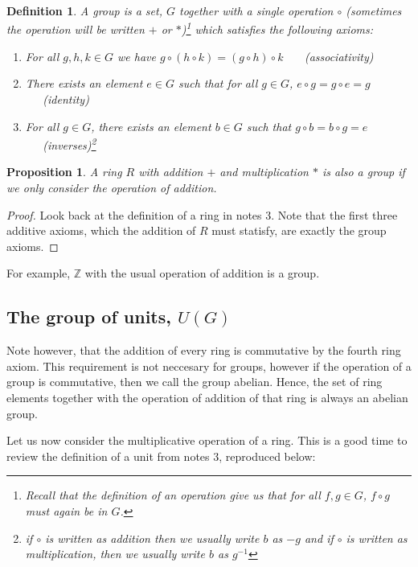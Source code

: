\documentclass{article}
\theoremstyle{problemstyle}
\newtheorem{proposition}{Proposition}
\newtheorem{definition}{Definition}
\begin{document}
\begin{definition}
A group is a set, $G$ together with a single operation $\circ$  (sometimes the operation will be written $+$ or $*$)\footnote{Recall that the definition of an operation give us that for all $f,g \in G$, $f \circ g$ must again be in $G$.} which satisfies the following axioms:

\begin{enumerate}
\item For all $g,h,k \in G$ we have $g \circ (h\circ k) = (g \circ h)\circ k$ \ \ \ (associativity)
\item There exists an element $e \in G$ such that for all $g \in G$, $e \circ g = g \circ e = g$ \ \ \ (identity)
\item For all $g \in G$, there exists an element $b \in G$ such that $g\circ b = b \circ g = e$ \ \ \ (inverses)\footnote{ if $\circ$ is written as addition then we usually write $b$ as $-g$ and if $\circ$ is written as multiplication, then we usually write $b$ as $g^{-1}$}
\end{enumerate}
\end{definition}

\begin{proposition}
A ring $R$ with addition $+$ and multiplication $*$ is also a group if we only consider the operation of addition. 
\end{proposition}

\begin{proof}
Look back at the definition of a ring in notes 3. Note that the first three additive axioms, which the addition of $R$ must statisfy, are exactly the group axioms. 
\end{proof}

For example, $\mathbb{Z}$ with the usual operation of addition is a group. 

\subsection*{The group of units, $U(G)$}

Note however, that the addition of every ring is commutative by the fourth ring axiom. This requirement is not neccesary for groups, however if the operation of a group is commutative, then we call the group abelian. Hence, the set of ring elements together with the operation of addition of that ring is always an abelian group. 

Let us now consider the multiplicative operation of a ring. This is a good time to review the definition of a unit from notes 3, reproduced below: 
\end{document}
